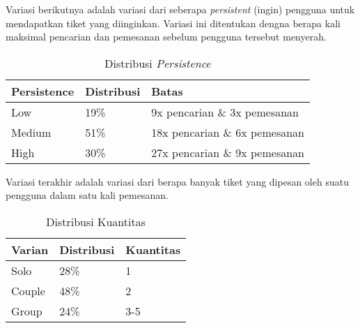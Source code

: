 Variasi berikutnya adalah variasi dari seberapa \textit{persistent} (ingin) pengguna untuk mendapatkan tiket yang diinginkan. Variasi ini ditentukan dengna berapa kali maksimal pencarian dan pemesanan sebelum pengguna tersebut menyerah.

\begin{table}[h]
    \centering
    \begin{tabular}{|l|l|l|}
        \hline
        \textbf{Persistence} & \textbf{Distribusi} & \textbf{Batas}                    \\
        \hline
        Low                  & 19\%                & 9x pencarian \& 3x pemesanan      \\
        \hline
        Medium               & 51\%                & 18x pencarian \& 6x     pemesanan \\
        \hline
        High                 & 30\%                & 27x pencarian \& 9x pemesanan     \\
        \hline
    \end{tabular}
    \caption{Distribusi \textit{Persistence}}
\end{table}

Variasi terakhir adalah variasi dari berapa banyak tiket yang dipesan oleh suatu pengguna dalam satu kali pemesanan.

\begin{table}[h]
    \centering
    \begin{tabular}{|l|l|l|}
        \hline
        \textbf{Varian} & \textbf{Distribusi} & \textbf{Kuantitas} \\
        \hline
        Solo            & 28\%                & 1                  \\
        \hline
        Couple          & 48\%                & 2                  \\
        \hline
        Group           & 24\%                & 3-5                \\
        \hline
    \end{tabular}
    \caption{Distribusi Kuantitas}
\end{table}
